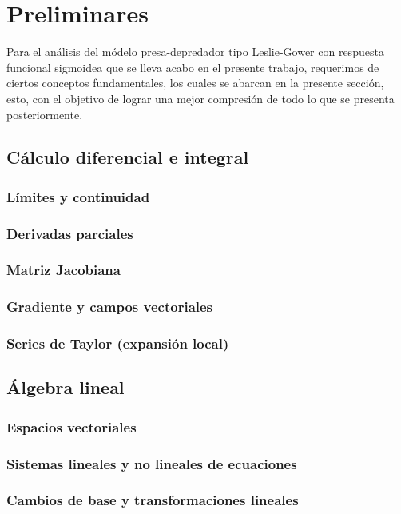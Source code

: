 \chapter{Preliminares}
    Para el análisis del módelo presa-depredador tipo Leslie-Gower con respuesta funcional sigmoidea que se lleva acabo en el presente trabajo, requerimos de ciertos conceptos fundamentales, los cuales se abarcan en la presente sección, esto, con el objetivo de lograr una mejor compresión de todo lo que se presenta posteriormente.
    
    \section{Cálculo diferencial e integral}
    \subsection{Límites y continuidad}
    \subsection{Derivadas parciales}
    \subsection{Matriz Jacobiana}
    \subsection{Gradiente y campos vectoriales}
    \subsection{Series de Taylor (expansión local)}
    
    \section{Álgebra lineal}
    \subsection{Espacios vectoriales}
    \subsection{Sistemas lineales y no lineales de ecuaciones}
    \subsection{Cambios de base y transformaciones lineales}
